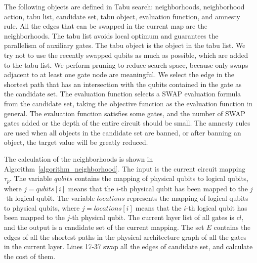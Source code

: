 \documentclass[runningheads]{llncs}
\begin{document}
The following objects are defined in Tabu search: neighborhoods, neighborhood action, tabu list, candidate set, tabu object, evaluation function, and amnesty rule. All the edges that can be swapped in the current map are the neighborhoods. The tabu list avoids local optimum and guarantees the parallelism of auxiliary gates. The tabu object is the object in the tabu list. We try not to use the recently swapped qubits as much as possible, which are added to the tabu list. We perform pruning to reduce search space, because only swaps adjacent to at least one gate node are meaningful. We select the edge in the shortest path that has an intersection with the qubits contained in the gate as the candidate set. The evaluation function selects a SWAP evaluation formula from the candidate set, 
 taking the objective function as the evaluation function in general. The evaluation function satisfies some gates, 
and the number of SWAP gates added or the depth of the entire circuit should be small. The amnesty rules are used when all objects in the candidate set are banned,  or after banning an object, the target value will be greatly reduced.

The calculation of the neighborhoods is shown in Algorithm~\ref{algorithm_neighborhood}. The input is the current circuit mapping $\tau_{p}$. The variable $qubits$ contains the mapping of physical qubits to logical qubits, where $ j = qubits [i] $ means that the $i$-th physical qubit has been mapped to the $j$-th logical qubit. The variable $ locations $ represents the mapping of logical qubits to physical qubits, where $ j = locations [i] $ means that the $i$-th logical qubit has been mapped to the $j$-th physical qubit.
The current layer list of all gates is $cl$, and the output is a candidate set of the current mapping. The set $E$ contains the edges of all the shortest paths in the physical architecture graph of all the gates in the current layer. Lines 17-37 swap all the edges of candidate set, and calculate the cost of them.
\end{document}
